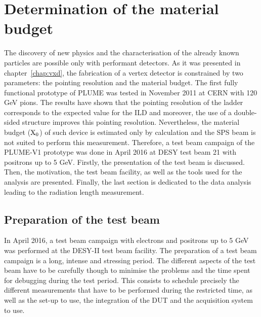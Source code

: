 \chapter{Determination of the material budget}
\label{chap:X0}

  The discovery of new physics and the characterisation of the already known particles are possible only with performant detectors.
  As it was presented in chapter~\ref{chap:vxd}, the fabrication of a vertex detector is constrained by two parameters: the pointing resolution and the material budget.
  The first fully functional prototype of \gls{PLUME} was tested in November 2011 at CERN with 120 GeV pions.
  The results have shown that the pointing resolution of the ladder corresponds to the expected value for the \gls{ILD} and moreover, the use of a double-sided structure improves this pointing resolution. 
  Nevertheless, the material budget ($\rm{X}_0$) of such device is estimated only by calculation and the SPS beam is not suited to perform this measurement.
  Therefore, a test beam campaign of the PLUME-V1 prototype was done in April 2016 at DESY test beam 21 with positrons up to 5 GeV.
  Firstly, the presentation of the test beam is discussed.
  Then, the motivation, the test beam facility, as well as the tools used for the analysis are presented.
  Finally, the last section is dedicated to the data analysis leading to the radiation length measurement.


\minitoc

  \section{Preparation of the test beam}

  In April 2016, a test beam campaign with electrons and positrons up to 5 GeV was performed at the DESY-II test beam facility.
  The preparation of a test beam campaign is a long, intense and stressing period.
  The different aspects of the test beam have to be carefully though to minimise the problems and the time spent for debugging during the test period.
  This consists to schedule precisely the different measurements that have to be performed during the restricted time, as well as the set-up to use, the integration of the \gls{DUT} and the acquisition system to use.
  
